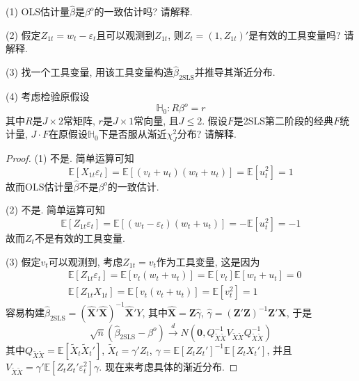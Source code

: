 \documentclass[cn,12pt,math=mtpro2,citestyle=gb7714-2015,bibstyle=gb7714-2015,twocol,mode=simple]{elegantbook}
\newcommand{\HH}{\mathbb{H}}
\newcommand{\E}{\mathbb{E}}
\newcommand{\hbeta}{\hat{\beta}}
\newcommand{\btls}{\hat{\beta}_{\text{2SLS}}}
\newcommand{\X}{\mathbf{X}}
\begin{document}
(1) OLS估计量$\hbeta$是$\beta^o$的一致估计吗? 请解释.

(2) 假定$Z_{1t}=w_t-\varepsilon_t$且可以观测到$Z_{1t}$, 则$Z_{t}=(1,Z_{1t})'$是有效的工具变量吗? 请解释.

(3) 找一个工具变量, 用该工具变量构造$\btls$并推导其渐近分布.

(4) 考虑检验原假设
$$\HH_0:R\beta^o=r$$
其中$R$是$J\times 2$常矩阵, $r$是$J\times 1$常向量, 且$J\leq 2$. 假设$F$是2SLS第二阶段的经典$F$统计量, $J\cdot F$在原假设$\HH_0$下是否服从渐近$\chi_J^2$分布? 请解释.

\begin{proof}
  (1) 不是. 简单运算可知
  $$\E[X_{1t}\varepsilon_t]=\E[(v_t+u_t)(w_t+u_t)]=\E[u_t^2]=1$$
  故而OLS估计量$\hbeta$不是$\beta^o$的一致估计.

  (2) 不是. 简单运算可知
  $$\E[Z_{1t}\varepsilon_t]=\E[(w_t-\varepsilon_t)(w_t+u_t)]=-\E[u_t^2]=-1$$
  故而$Z_t$不是有效的工具变量.

  (3) 假定$v_t$可以观测到, 考虑$Z_{1t}=v_t$作为工具变量, 这是因为
  \begin{align*}
  &\E[Z_{1t}\varepsilon_t]=\E[v_t(w_t+u_t)]=\E[v_t]\E[w_t+u_t]=0 \\
  &\E[Z_{1t}X_{1t}]=\E[v_t(v_t+u_t)]=\E[v_t^2]=1
  \end{align*}
  容易构建$\btls=(\hat{\X}'\hat{\X})^{-1}\hat{\X}'Y$, 其中$\hat{\X}=\mathbf{Z}\hat{\gamma}$, $\hat{\gamma}=(\mathbf{Z}'\mathbf{Z})^{-1}\mathbf{Z}'\X$, 于是
  $$\sqrt{n}(\btls-\beta^o)\xrightarrow{d}N\left(\mathbf{0},Q_{\tilde{X}\tilde{X}}^{-1}V_{\tilde{X}\tilde{X}}Q_{\tilde{X}\tilde{X}}^{-1}\right)$$
  其中$Q_{\tilde{X}\tilde{X}}=\E[\tilde{X}_t\tilde{X}_t']$, $\tilde{X}_t=\gamma'Z_t$, $\gamma=\E[Z_tZ_t']^{-1}\E[Z_tX_t']$, 并且$\displaystyle V_{\tilde{X}\tilde{X}}=\gamma'\E[Z_tZ_t'\varepsilon_t^2]\gamma$. 现在来考虑具体的渐近分布.


\end{proof}
\end{document}
